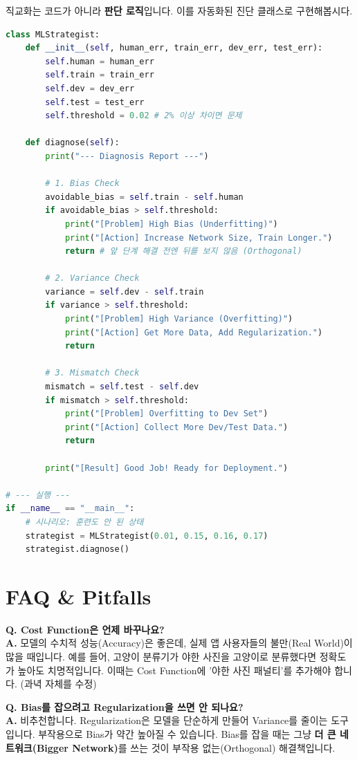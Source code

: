 \documentclass[11pt,a4paper]{book}
\theoremstyle{definition}
\begin{document}
직교화는 코드가 아니라 \textbf{판단 로직}입니다. 이를 자동화된 진단 클래스로 구현해봅시다.

\begin{lstlisting}[language=Python, caption=ML Project Diagnosis Logic, breaklines=true]
class MLStrategist:
    def __init__(self, human_err, train_err, dev_err, test_err):
        self.human = human_err
        self.train = train_err
        self.dev = dev_err
        self.test = test_err
        self.threshold = 0.02 # 2% 이상 차이면 문제

    def diagnose(self):
        print("--- Diagnosis Report ---")
        
        # 1. Bias Check
        avoidable_bias = self.train - self.human
        if avoidable_bias > self.threshold:
            print("[Problem] High Bias (Underfitting)")
            print("[Action] Increase Network Size, Train Longer.")
            return # 앞 단계 해결 전엔 뒤를 보지 않음 (Orthogonal)

        # 2. Variance Check
        variance = self.dev - self.train
        if variance > self.threshold:
            print("[Problem] High Variance (Overfitting)")
            print("[Action] Get More Data, Add Regularization.")
            return

        # 3. Mismatch Check
        mismatch = self.test - self.dev
        if mismatch > self.threshold:
            print("[Problem] Overfitting to Dev Set")
            print("[Action] Collect More Dev/Test Data.")
            return

        print("[Result] Good Job! Ready for Deployment.")

# --- 실행 ---
if __name__ == "__main__":
    # 시나리오: 훈련도 안 된 상태
    strategist = MLStrategist(0.01, 0.15, 0.16, 0.17)
    strategist.diagnose()
\end{lstlisting}

\section{FAQ \& Pitfalls}

\textbf{Q. Cost Function은 언제 바꾸나요?} \\
\textbf{A.} 모델의 수치적 성능(Accuracy)은 좋은데, 실제 앱 사용자들의 불만(Real World)이 많을 때입니다. 예를 들어, 고양이 분류기가 야한 사진을 고양이로 분류했다면 정확도가 높아도 치명적입니다. 이때는 Cost Function에 '야한 사진 패널티'를 추가해야 합니다. (과녁 자체를 수정)

\textbf{Q. Bias를 잡으려고 Regularization을 쓰면 안 되나요?} \\
\textbf{A.} 비추천합니다. Regularization은 모델을 단순하게 만들어 Variance를 줄이는 도구입니다. 부작용으로 Bias가 약간 높아질 수 있습니다. Bias를 잡을 때는 그냥 \textbf{더 큰 네트워크(Bigger Network)}를 쓰는 것이 부작용 없는(Orthogonal) 해결책입니다.
\end{document}
